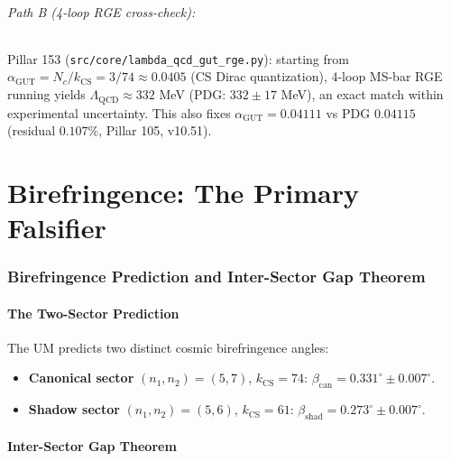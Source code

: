 \documentclass[12pt,a4paper]{article}
\begin{document}
\paragraph{Path B (4-loop RGE cross-check):}
Pillar 153 (\texttt{src/core/lambda\_qcd\_gut\_rge.py}): starting from
$\alpha_\mathrm{GUT} = N_c/k_\mathrm{CS} = 3/74 \approx 0.0405$ (CS Dirac
quantization), 4-loop MS-bar RGE running yields
$\Lambda_\mathrm{QCD} \approx 332$ MeV (PDG: $332 \pm 17$ MeV), an exact match
within experimental uncertainty.  This also fixes $\alpha_\mathrm{GUT} = 0.04111$
vs PDG $0.04115$ (residual $0.107\%$, Pillar 105, v10.51).

\part{Birefringence: The Primary Falsifier}

\section{Birefringence Prediction and Inter-Sector Gap Theorem}
\label{sec:birefringence}

\subsection{The Two-Sector Prediction}

The UM predicts two distinct cosmic birefringence angles:
\begin{itemize}
  \item \textbf{Canonical sector} $(n_1, n_2) = (5, 7)$, $k_\mathrm{CS} = 74$:
        $\beta_\mathrm{can} = 0.331^\circ \pm 0.007^\circ$.
  \item \textbf{Shadow sector} $(n_1, n_2) = (5, 6)$, $k_\mathrm{CS} = 61$:
        $\beta_\mathrm{shad} = 0.273^\circ \pm 0.007^\circ$.
\end{itemize}

\subsection{Inter-Sector Gap Theorem}
\end{document}
